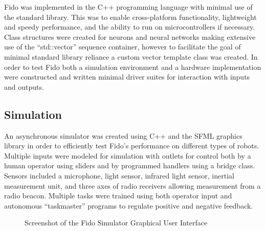 Fido was implemented in the C++ programming language with minimal use of the standard library.  This was to enable cross-platform functionality, lightweight and speedy performance, and the ability to run on microcontrollers if necessary.  Class structures were created for neurons and neural networks making extensive use of the ``std::vector'' sequence container, however to facilitate the goal of minimal standard library reliance a custom vector template class was created.  In order to test Fido both a simulation environment and a hardware implementation were constructed and written minimal driver suites for interaction with inputs and outputs. 

\subsection{Simulation}

An asynchronous simulator was created using C++ and the SFML graphics library in order to efficiently test Fido's performance on different types of robots.  Multiple inputs were modeled for simulation with outlets for control both by a human operator using sliders and by programmed handlers using a bridge class.  Sensors included a microphone, light sensor, infrared light sensor, inertial measurement unit, and three axes of radio receivers allowing measurement from a radio beacon.  Multiple tasks were trained using both operator input and autonomous ``taskmaster'' programs to regulate positive and negative feedback.


\begin{figure}
	\centering
	\caption{Screenshot of the Fido Simulator Graphical User Interface}
\end{figure}

